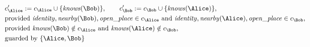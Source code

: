 \begin{align*}
&
c'_
{
\Alice
}
 := 
c_
{
\Alice
}
 \cup 
\{
\mathit{\detokenize{
knows
}}
(
\Bob
)
\}
, \qquad 
c'_
{
\Bob
}
 := 
c_
{
\Bob
}
 \cup 
\{
\mathit{\detokenize{
knows
}}
(
\Alice
)
\}
,\\
&
\text{provided } 
\mathit{\detokenize{
identity
}}
,
\mathit{\detokenize{
nearby
}}
(
\Bob
)
,
\mathit{\detokenize{
open_place
}}
 \in c_
{
\Alice
}
 \text{ and } 
\mathit{\detokenize{
identity
}}
,
\mathit{\detokenize{
nearby
}}
(
\Alice
)
,
\mathit{\detokenize{
open_place
}}
 \in c_
{
\Bob
}
,\\
&
\text{provided } 
\mathit{\detokenize{
knows
}}
(
\Bob
)
 \notin c_
{
\Alice
}
 \text{ and } 
\mathit{\detokenize{
knows
}}
(
\Alice
)
 \notin c_
{
\Bob
}
,\\
&
\text{guarded by } \{
\Alice
,
\Bob
\}
\end{align*}
